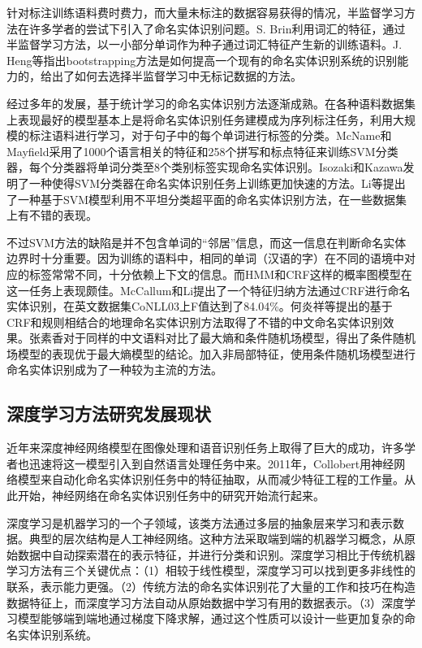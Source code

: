 \documentclass[winfonts,master,oneside,nobackinfo]{njuthesis}
\begin{document}
针对标注训练语料费时费力，而大量未标注的数据容易获得的情况，半监督学习方法在许多学者的尝试下引入了命名实体识别问题。S. Brin\cite{Brin}利用词汇的特征，通过半监督学习方法，以一小部分单词作为种子通过词汇特征产生新的训练语料。J. Heng\cite{Heng}等指出bootstrapping方法是如何提高一个现有的命名实体识别系统的识别能力的，给出了如何去选择半监督学习中无标记数据的方法。

经过多年的发展，基于统计学习的命名实体识别方法逐渐成熟。在各种语料数据集上表现最好的模型基本上是将命名实体识别任务建模成为序列标注任务，利用大规模的标注语料进行学习，对于句子中的每个单词进行标签的分类。McName和Mayfield\cite{McName}采用了1000个语言相关的特征和258个拼写和标点特征来训练SVM分类器，每个分类器将单词分类至8个类别标签实现命名实体识别。Isozaki和Kazawa\cite{Isozki}发明了一种使得SVM分类器在命名实体识别任务上训练更加快速的方法。Li\cite{Li}等提出了一种基于SVM模型利用不平坦分类超平面的命名实体识别方法，在一些数据集上有不错的表现。

不过SVM方法的缺陷是并不包含单词的“邻居”信息，而这一信息在判断命名实体边界时十分重要。因为训练的语料中，相同的单词（汉语的字）在不同的语境中对应的标签常常不同，十分依赖上下文的信息。而HMM和CRF这样的概率图模型在这一任务上表现颇佳。McCallum和Li\cite{McCallum}提出了一个特征归纳方法通过CRF进行命名实体识别，在英文数据集CoNLL03上F值达到了84.04\%。何炎祥\cite{hyx}等提出的基于CRF和规则相结合的地理命名实体识别方法取得了不错的中文命名实体识别效果。张素香\cite{zsx}对于同样的中文语料对比了最大熵和条件随机场模型，得出了条件随机场模型的表现优于最大熵模型的结论。加入非局部特征，使用条件随机场模型进行命名实体识别成为了一种较为主流的方法。

\subsection{深度学习方法研究发展现状}
近年来深度神经网络模型在图像处理和语音识别任务上取得了巨大的成功，许多学者也迅速将这一模型引入到自然语言处理任务中来。2011年，Collobert\cite{Collobert}用神经网络模型来自动化命名实体识别任务中的特征抽取，从而减少特征工程的工作量。从此开始，神经网络在命名实体识别任务中的研究开始流行起来。

深度学习是机器学习的一个子领域，该类方法通过多层的抽象层来学习和表示数据。典型的层次结构是人工神经网络。这种方法采取端到端的机器学习概念，从原始数据中自动探索潜在的表示特征，并进行分类和识别。深度学习相比于传统机器学习方法有三个关键优点：（1）相较于线性模型，深度学习可以找到更多非线性的联系，表示能力更强。（2）传统方法的命名实体识别花了大量的工作和技巧在构造数据特征上，而深度学习方法自动从原始数据中学习有用的数据表示。（3）深度学习模型能够端到端地通过梯度下降求解，通过这个性质可以设计一些更加复杂的命名实体识别系统。
\end{document}
